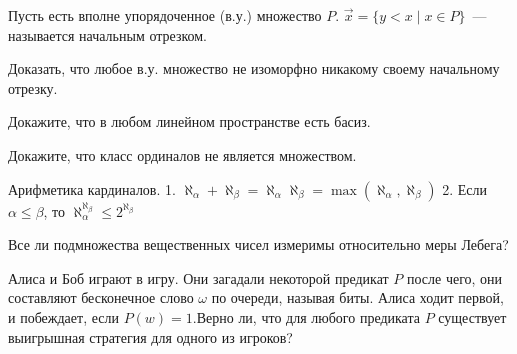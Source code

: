 \setcounter{curtask}{1}


Пусть есть вполне упорядоченное (в.у.) множество $P$.
$\vec{x} = \{y < x \mid x \in P\}$~--- называется начальным отрезком.

\begin{task}
    Доказать, что любое в.у. множество не изоморфно никакому своему начальному отрезку.
\end{task}

\begin{task}
    Докажите, что в любом линейном пространстве есть басиз.
\end{task}

\begin{task}
    Докажите, что класс ординалов не является множеством.
\end{task}

\begin{task}
    Арифметика кардиналов.
    1. $\aleph_{\alpha} + \aleph_{\beta} = \aleph_{\alpha}  \aleph_{\beta} =
    	\max(\aleph_{\alpha}, \aleph_{\beta})$
    2. Если $\alpha \le \beta$, то $\aleph_{\alpha}^{\aleph_{\beta}} \le 2^{\aleph_{\beta}}$
\end{task}

\begin{task}
    Все ли подмножества вещественных чисел измеримы относительно меры Лебега?
\end{task}

\begin{task}
    Алиса и Боб играют в игру. Они загадали некоторой предикат $P$ после чего, они
    составляют бесконечное слово $\omega$ по очереди, называя биты. Алиса ходит
    первой, и побеждает, если $P(w) = 1$.Верно ли, что для любого предиката $P$
    существует выигрышная стратегия для одного из игроков?
\end{task}